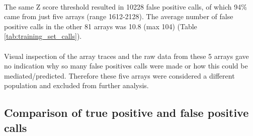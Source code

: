 \paragraph*{}
The same Z score threshold resulted in 10228 false positive calls, of which 94\% came from just five arrays (range 1612-2128). The average number of false positive calls in the other 81 arrays was 10.8 (max 104) (Table \ref{tab:training_set_calls}).
\paragraph*{}
Visual inspection of the array traces and the raw data from these 5 arrays gave no indication why so many false positives calls were made or how this could be mediated/predicted. Therefore these five arrays were considered a different population and excluded from further analysis.
\subsection{Comparison of true positive and false positive calls}
\begin{table}[]
\centering
\caption{The calls made in 81 training cases using a range of Z score thresholds. The true positive call was missed in at least 5 cases across all thresholds, with a false positive call made in at least 1 in 4 cases. The number of false positive calls, and the average number of calls made decreased as the Z score threshold increased.}
\label{tab:training_set_calls}
\end{table}
